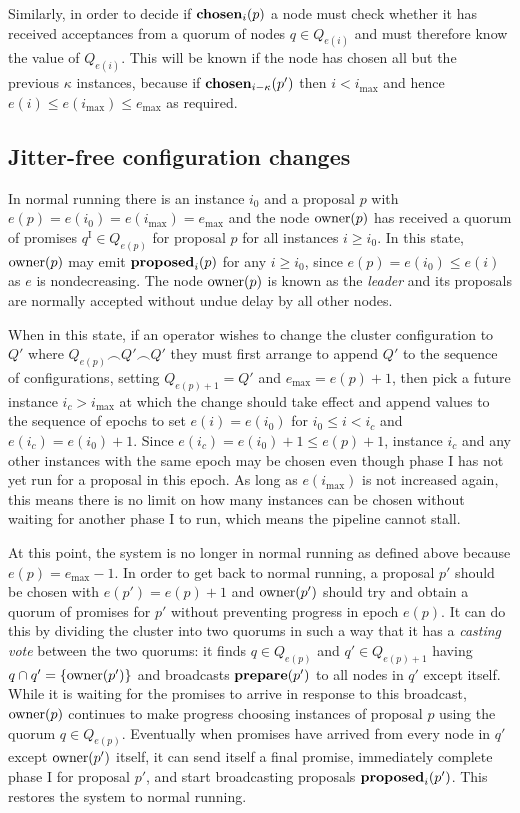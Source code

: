 \documentclass[journal]{IEEEtran}
\begin{document}
Similarly, in order to decide if $\mathbf{chosen}_{i}(p)$ a node must check whether it
has received acceptances from a quorum of nodes $q \in Q_{e(i)}$ and must
therefore know the value of $Q_{e(i)}$. This will be known if the node has
chosen all but the previous $\kappa$ instances, because if
$\mathbf{chosen}_{i-\kappa}(p')$ then $i < i_\mathrm{max}$ and hence ${e(i) \le
e(i_\mathrm{max}) \le e_\mathrm{max}}$ as required.

\subsection{Jitter-free configuration changes}

In normal running there is an instance $i_0$ and a proposal $p$ with ${e(p) =
e(i_0) = e(i_\mathrm{max}) = e_\mathrm{max}}$ and the node $\mathrm{owner}(p)$ has
received a quorum of promises $q^\textrm{I} \in Q_{e(p)}$ for proposal $p$ for
all instances $i \ge i_0$. In this state, $\mathrm{owner}(p)$ may emit $\mathbf{proposed}_{i}(p)$
for any $i \ge i_0$, since $e(p) = e(i_0) \le e(i)$ as $e$ is nondecreasing.
The node $\mathrm{owner}(p)$ is known as the \textit{leader} and its proposals are
normally accepted without undue delay by all other nodes.

When in this state, if an operator wishes to change the cluster configuration
to $Q'$ where $Q_{e(p)} \frown Q' \frown Q'$ they must first arrange to append
$Q'$ to the sequence of configurations, setting $Q_{e(p)+1} = Q'$ and
$e_\mathrm{max} = e(p) + 1$, then pick a future instance $i_c > i_\mathrm{max}$
at which the change should take effect and append values to the sequence of
epochs to set $e(i) = e(i_0)$ for $i_0 \le i < i_c$ and $e(i_c) = e(i_0) + 1$.
Since $e(i_c) = e(i_0) + 1 \le e(p) + 1$, instance $i_c$ and any other
instances with the same epoch may be chosen even though phase I has not yet run
for a proposal in this epoch. As long as $e(i_\mathrm{max})$ is not increased
again, this means there is no limit on how many instances can be chosen without
waiting for another phase I to run, which means the pipeline cannot stall.

At this point, the system is no longer in normal running as defined above
because $e(p) = e_\mathrm{max} - 1$. In order to get back to normal running, a
proposal $p'$ should be chosen with $e(p') = e(p) + 1$ and $\mathrm{owner}(p')$ should
try and obtain a quorum of promises for $p'$ without preventing progress in
epoch $e(p)$. It can do this by dividing the cluster into two quorums in such a
way that it has a \textit{casting vote} between the two quorums: it finds $q
\in Q_{e(p)}$ and $q' \in Q_{e(p)+1}$ having $q \cap q' = \{\mathrm{owner}(p')\}$ and
broadcasts $\mathbf{prepare}(p')$ to all nodes in $q'$ except itself. While it is waiting
for the promises to arrive in response to this broadcast, $\mathrm{owner}(p)$ continues
to make progress choosing instances of proposal $p$ using the quorum $q \in
Q_{e(p)}$.  Eventually when promises have arrived from every node in $q'$
except $\mathrm{owner}(p')$ itself, it can send itself a final promise, immediately
complete phase I for proposal $p'$, and start broadcasting proposals
$\mathbf{proposed}_{i}(p')$.  This restores the system to normal running.
\end{document}
